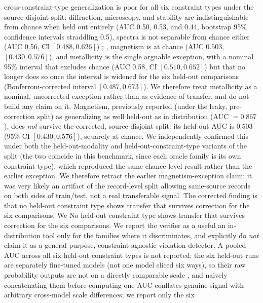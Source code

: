 \documentclass[pdflatex,sn-nature]{sn-jnl}
\newcommand{\rev}[1]{#1} %
\newcommand{\rev}[1]{{\color{blue}#1}} %
\providecommand{\DIFadd}[1]{{\protect\color{blue} \sf #1}} %
\providecommand{\DIFdel}[1]{{\protect\color{red} \scriptsize #1}} %
\providecommand{\DIFaddbegin}{} %
\providecommand{\DIFaddend}{} %
\providecommand{\DIFdelbegin}{} %
\providecommand{\DIFdelend}{} %
\providecommand{\DIFscaledelfig}{0.5}
\newlength{\DIFdelgraphicswidth} %
\newlength{\DIFdelgraphicsheight} %
\providecommand{\DIFaddincludegraphics}[2][]{{\color{blue}\fbox{\DIFOincludegraphics[#1]{#2}}}} %
\providecommand{\DIFdelincludegraphics}[2][]{%
\sbox{\DIFdelgraphicsbox}{\DIFOincludegraphics[#1]{#2}}%
\settoboxwidth{\DIFdelgraphicswidth}{\DIFdelgraphicsbox} %
\settoboxtotalheight{\DIFdelgraphicsheight}{\DIFdelgraphicsbox} %
\scalebox{\DIFscaledelfig}{%
\parbox[b]{\DIFdelgraphicswidth}{\usebox{\DIFdelgraphicsbox}\\[-\baselineskip] \rule{\DIFdelgraphicswidth}{0em}}\llap{\resizebox{\DIFdelgraphicswidth}{\DIFdelgraphicsheight}{%
\setlength{\unitlength}{\DIFdelgraphicswidth}%
\begin{picture}(1,1)%
\thicklines\linethickness{2pt} %
{\color[rgb]{1,0,0}\put(0,0){\framebox(1,1){}}}%
{\color[rgb]{1,0,0}\put(0,0){\line( 1,1){1}}}%
{\color[rgb]{1,0,0}\put(0,1){\line(1,-1){1}}}%
\end{picture}%
}\hspace*{3pt}}} %
} %
\DeclareRobustCommand{\DIFaddbegin}{\DIFOaddbegin \let\includegraphics\DIFaddincludegraphics} %
\DeclareRobustCommand{\DIFaddend}{\DIFOaddend \let\includegraphics\DIFOincludegraphics} %
\DeclareRobustCommand{\DIFdelbegin}{\DIFOdelbegin \let\includegraphics\DIFdelincludegraphics} %
\DeclareRobustCommand{\DIFdelend}{\DIFOaddend \let\includegraphics\DIFOincludegraphics} %
\begin{document}
cross-constraint-type generalization is poor for all six constraint types\DIFdelbegin \DIFdel{under the
source-disjoint split}\DIFdelend : diffraction, microscopy, and stability
are indistinguishable from chance when held out entirely (AUC 0.50, 0.53, and 0.44,
bootstrap 95\% confidence intervals straddling 0.5), spectra is not separable from chance either (AUC
0.56, CI $[0.488,0.626]$)\DIFdelbegin \DIFdel{; }\DIFdelend \DIFaddbegin \DIFadd{\rev{, magnetism is at chance (AUC $0.503$, $[0.430,0.576]$),} }\DIFaddend and metallicity is the single arguable exception, with a nominal
95\% interval that excludes chance (AUC 0.58, CI $[0.510,0.652]$) but that no longer does so
once the interval is widened for the six held-out comparisons (Bonferroni-corrected interval
$[0.487,0.673]$). We therefore treat metallicity as a nominal, uncorrected exception rather
than as evidence of transfer, and do not build any claim on it. \DIFdelbegin \DIFdel{Magnetism, previously reported (under
the leaky, pre-correction split) as generalizing as well held-out as in distribution
(AUC $=0.867$), does \emph{not} survive the corrected, source-disjoint split: its held-out
AUC is $0.503$ (95\% CI $[0.430,0.576]$), squarely at chance. We independently confirmed
this under both the held-out-modality and held-out-constraint-type variants of the split
(the two coincide in this benchmark, since each oracle family is its own constraint type),
which reproduced the same chance-level result rather than the earlier exception. We
therefore retract the earlier magnetism-exception claim: it was very likely an artifact of
the record-level split allowing same-source records on both sides of train/test, not a
real transferable signal. The corrected finding is that no held-out constraint type shows
transfer that survives correction for the six comparisons. We }\DIFdelend \DIFaddbegin \DIFadd{\rev{No held-out constraint type shows transfer that survives correction for the six comparisons.} We }\DIFaddend report the verifier as \DIFdelbegin \DIFdel{a useful
}\DIFdelend \DIFaddbegin \DIFadd{an
}\DIFaddend in-distribution tool \DIFdelbegin \DIFdel{only}\DIFdelend \DIFaddbegin \DIFadd{\rev{for the families where it discriminates}}\DIFaddend , and explicitly do \emph{not} claim it as a general-purpose,
constraint-agnostic violation detector. A pooled AUC across all six held-out constraint
types is not reported: the six held-out runs are separately fine-tuned models\DIFdelbegin \DIFdel{(not one
model sliced six ways)}\DIFdelend , so their raw
probability outputs are not on a directly comparable scale\DIFdelbegin \DIFdel{, and naively concatenating them before computing one AUC conflates genuine signal
with arbitrary cross-model scale differences}\DIFdelend ; we report only the six
\end{document}
